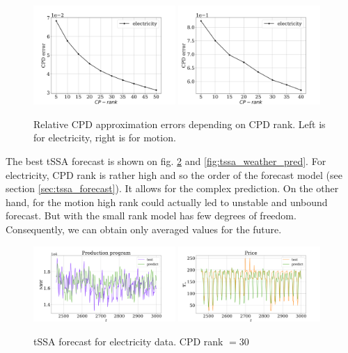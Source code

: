 \documentclass[referee, pdflatex]{sn-jnl}
\theoremstyle{definition}
\theoremstyle{plain}
\begin{document}
	\begin{figure}[h]
		\centering
		\includegraphics[width=0.48\textwidth, keepaspectratio]{../../experiments/electricity/tssa/figs/CPD_error.png}
		\includegraphics[width=0.48\textwidth, keepaspectratio]{../../experiments/motion/tssa/figs/CPD_error.png}
		\caption{Relative CPD approximation errors depending on CPD rank. Left is for electricity, right is for motion.}\label{fig:cpd_errors}
	\end{figure}
	
	The best tSSA forecast is shown on fig. \ref{fig:tssa_electr_pred} and \ref{fig:tssa_weather_pred}. For electricity, CPD rank is rather high and so the order of the forecast model (see section \ref{sec:tssa_forecast}). It allows for the complex prediction. On the other hand, for the motion high rank could actually led to unstable and unbound forecast. But with the small rank model has few degrees of freedom. Consequently, we can obtain only averaged values for the future.
	
	\begin{figure}[h]
		\centering
		\includegraphics[width=0.48\textwidth, keepaspectratio]{../../experiments/electricity/tssa/figs/prediction/cpd_rank_30/Production_program.png}
		\includegraphics[width=0.48\textwidth, keepaspectratio]{../../experiments/electricity/tssa/figs/prediction/cpd_rank_30/Price.png}
		\caption{tSSA forecast for electricity data. CPD rank $ = 30 $}\label{fig:tssa_electr_pred}
	\end{figure}
	
\end{document}
